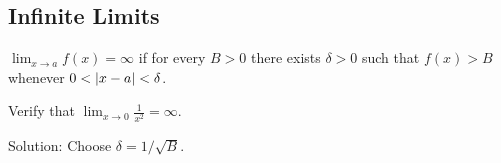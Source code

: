 \documentclass[../calc1-main.tex]{subfiles}
\begin{document}
\subsection*{Infinite Limits}
\begin{definition}
    $\lim_{x \to a} f(x) = \infty$ if for every $B>0$ there exists $\delta>0$ such that $f(x) > B$ whenever $0<\left\lvert x-a \right\rvert<\delta$.
\end{definition}

\begin{example}
    Verify that $\lim_{x \to 0} \frac{1}{x^2} = \infty$.

    Solution: Choose $\delta = 1/\sqrt{B}$.
\end{example}
\end{document}
